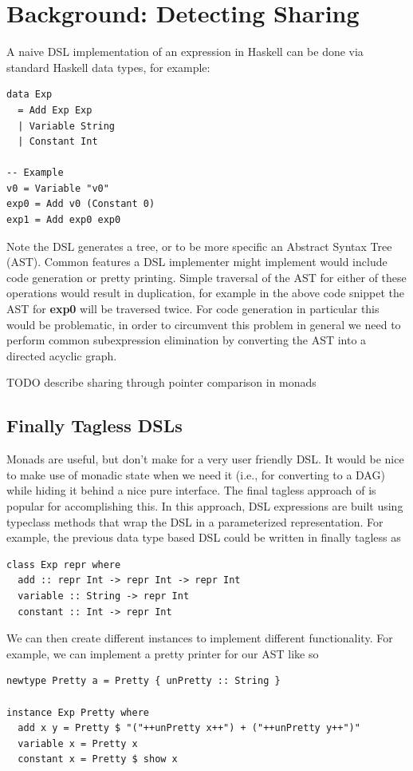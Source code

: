 \documentclass[runningheads]{llncs}
\begin{document}
\section{Background: Detecting Sharing}

A naive DSL implementation of an expression in Haskell can be done via standard
Haskell data types, for example:

\begin{verbatim}
data Exp
  = Add Exp Exp
  | Variable String
  | Constant Int

-- Example
v0 = Variable "v0"
exp0 = Add v0 (Constant 0)
exp1 = Add exp0 exp0
\end{verbatim}

Note the DSL generates a tree, or to be more specific an Abstract Syntax Tree
(AST). Common features a DSL implementer might implement would include code
generation or pretty printing. Simple traversal of the AST for either of these
operations would result in duplication, for example in the above code snippet
the AST for {\bf exp0} will be traversed twice. For code generation in
particular this would be problematic, in order to circumvent this problem in
general we need to perform common subexpression elimination by converting the
AST into a directed acyclic graph. %

TODO describe sharing through pointer comparison in monads
\subsection{Finally Tagless DSLs}

Monads are useful, but don't make for a very user friendly DSL. It would be nice
to make use of monadic state when we need it (i.e., for converting to a DAG)
while hiding it behind a nice pure interface. The final tagless approach of
\cite{carette:finallytagless} is popular for accomplishing this. In this
approach, DSL expressions are built using typeclass methods that wrap the DSL in
a parameterized representation. For example, the previous data type based DSL
could be written in finally tagless as

\begin{verbatim}
class Exp repr where
  add :: repr Int -> repr Int -> repr Int
  variable :: String -> repr Int
  constant :: Int -> repr Int
\end{verbatim}

We can then create different instances to implement different functionality.
For example, we can implement a pretty printer for our AST like so
\begin{verbatim}
newtype Pretty a = Pretty { unPretty :: String }

instance Exp Pretty where
  add x y = Pretty $ "("++unPretty x++") + ("++unPretty y++")"
  variable x = Pretty x
  constant x = Pretty $ show x
\end{verbatim}
\end{document}
